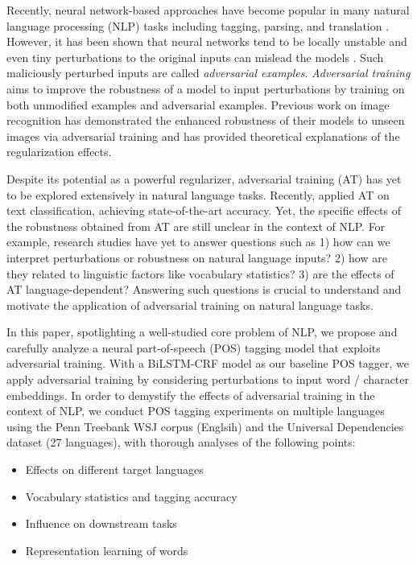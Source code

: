 \documentclass[11pt,a4paper]{article}
\begin{document}
 
Recently, neural network-based approaches have become popular in many natural language processing (NLP) tasks including tagging, parsing, and translation \cite{chen2014fast,bahdanau2014neural,ma-hovy:2016:P16-1}.
However, it has been shown that neural networks tend to be locally unstable
and
even tiny perturbations to the original inputs can mislead the models \cite{Szegedy2013}. Such maliciously perturbed inputs are called {\it adversarial examples}.
{\it Adversarial training} \cite{Goodfellow2015explain} aims to improve the robustness of a model to input perturbations by training on both unmodified examples and adversarial examples.
Previous work \cite{Goodfellow2015explain,shaham2015understanding} on image recognition 
has demonstrated the enhanced robustness of their models to unseen images via adversarial training and
has provided theoretical explanations of
the regularization effects.


Despite its potential as a powerful regularizer, adversarial training (AT) has yet to be explored extensively in natural language tasks.
Recently,  applied AT on text classification,
achieving state-of-the-art accuracy.
Yet, the specific effects of the robustness obtained from AT are still unclear in the context of NLP.
For example,
research studies have yet to answer questions such as
1) how can we interpret perturbations or robustness on natural language inputs?
2) how are they related to linguistic factors like vocabulary statistics?
3) are the effects of AT language-dependent?
Answering such questions is crucial to understand and motivate the application of adversarial training on natural language tasks. 


In this paper,
spotlighting a well-studied core problem of NLP, we propose and carefully analyze a neural part-of-speech (POS) tagging model that exploits adversarial training.
With a BiLSTM-CRF model \cite{Huang2015BidirectionalLM,ma-hovy:2016:P16-1} as our baseline POS tagger, we
apply adversarial training by considering perturbations to input word \!/\! character embeddings.
In order to demystify the effects of adversarial training in the context of NLP, we conduct POS tagging experiments on multiple languages using the Penn Treebank WSJ corpus (Englsih) and the Universal Dependencies dataset (27 languages), with thorough analyses of the following points: \vspace{0mm}
\begin{itemize}[topsep=2mm]
\setlength{\parskip}{-1.4mm}
\setlength{\leftskip}{-0mm}
    \item Effects on different target languages
    \item Vocabulary statistics and tagging accuracy
    \item Influence on downstream tasks
    \item Representation learning of words\vspace{-1mm}
\end{itemize}
\end{document}
